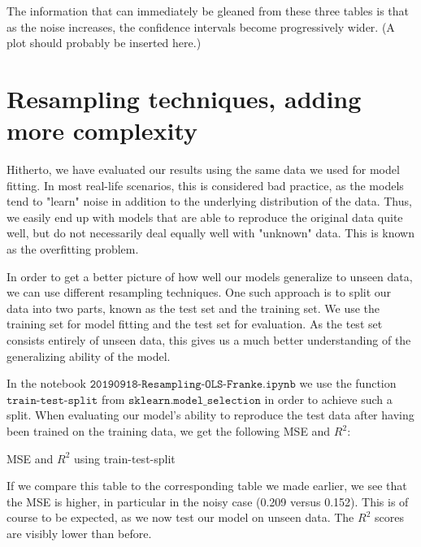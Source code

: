 \documentclass{article}
\begin{document}
The information that can immediately be gleaned from these three tables is that as the noise increases, the confidence intervals become progressively wider. (A plot should probably be inserted here.)

\section{Resampling techniques, adding more complexity}
Hitherto, we have evaluated our results using the same data we used for model fitting. In most real-life scenarios, this is considered bad practice, as the models tend to "learn" noise in addition to the underlying distribution of the data. Thus, we easily end up with models that are able to reproduce the original data quite well, but do not necessarily deal equally well with "unknown" data. This is known as the overfitting problem.

In order to get a better picture of how well our models generalize to unseen data, we can use different resampling techniques. One such approach is to split our data into two parts, known as the test set and the training set. We use the training set for model fitting and the test set for evaluation. As the test set consists entirely of unseen data, this gives us a much better understanding of the generalizing ability of the model.

In the notebook $\texttt{20190918-Resampling-OLS-Franke.ipynb}$ we use the function $\texttt{train-test-split}$ from $\texttt{sklearn.model\_selection}$ in order to achieve such a split. When evaluating our model's ability to reproduce the test data after having been trained on the training data, we get the following MSE and $R^2$:

\begin{table}[h!]
    \caption{MSE and $R^2$ using train-test-split}
\end{table}

If we compare this table to the corresponding table we made earlier, we see that the MSE is higher, in particular in the noisy case (0.209 versus 0.152). This is of course to be expected, as we now test our model on unseen data. The $R^2$ scores are visibly lower than before.
\end{document}
